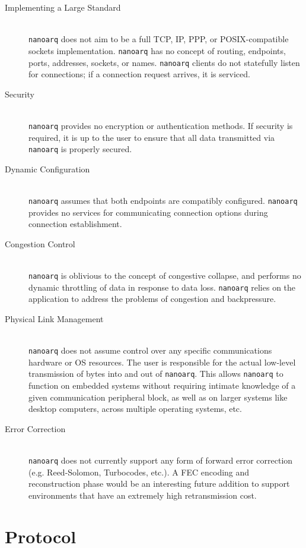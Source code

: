 \documentclass[11pt]{article}
\newcommand{\nanoarq}{\texttt{nanoarq}}
\begin{document}
\begin{description}
\item[Implementing a Large Standard] \hfill \\
    \nanoarq{} does not aim to be a full TCP, IP, PPP, or POSIX-compatible sockets implementation. \nanoarq{} has no concept of routing, endpoints, ports, addresses, sockets, or names. \nanoarq{} clients do not statefully listen for connections; if a connection request arrives, it is serviced.
\item[Security] \hfill \\
    \nanoarq{} provides no encryption or authentication methods. If security is required, it is up to the user to ensure that all data transmitted via \nanoarq{} is properly secured.
\item[Dynamic Configuration] \hfill \\
    \nanoarq{} assumes that both endpoints are compatibly configured. \nanoarq{} provides no services for communicating connection options during connection establishment.
\item[Congestion Control] \hfill \\
    \nanoarq{} is oblivious to the concept of congestive collapse, and performs no dynamic throttling of data in response to data loss. \nanoarq{} relies on the application to address the problems of congestion and backpressure.
\item[Physical Link Management] \hfill \\
    \nanoarq{} does not assume control over any specific communications hardware or OS resources. The user is responsible for the actual low-level transmission of bytes into and out of \nanoarq{}. This allows \nanoarq{} to function on embedded systems without requiring intimate knowledge of a given communication peripheral block, as well as on larger systems like desktop computers, across multiple operating systems, etc.
\item[Error Correction] \hfill \\
    \nanoarq{} does not currently support any form of forward error correction (e.g. Reed-Solomon, Turbocodes, etc.). A FEC encoding and reconstruction phase would be an interesting future addition to support environments that have an extremely high retransmission cost.
\end{description}

\section{Protocol}
\end{document}
